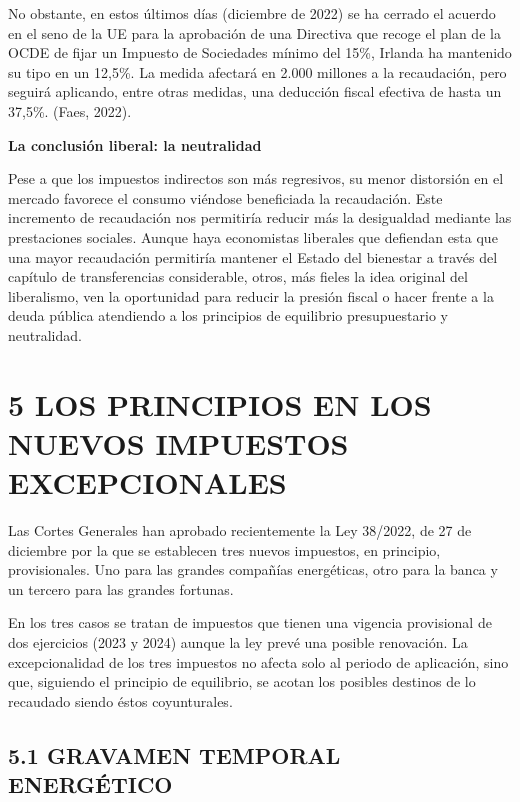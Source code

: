 \documentclass[
]{article}
\begin{document}
No obstante, en estos últimos días (diciembre de 2022) se ha cerrado el
acuerdo en el seno de la UE para la aprobación de una Directiva que
recoge el plan de la OCDE de fijar un Impuesto de Sociedades mínimo del
15\%, Irlanda ha mantenido su tipo en un 12,5\%. La medida afectará en
2.000 millones a la recaudación, pero seguirá aplicando, entre otras
medidas, una deducción fiscal efectiva de hasta un 37,5\%. (Faes, 2022).

\textbf{La conclusión liberal: la neutralidad}

Pese a que los impuestos indirectos son más regresivos, su menor
distorsión en el mercado favorece el consumo viéndose beneficiada la
recaudación. Este incremento de recaudación nos permitiría reducir más
la desigualdad mediante las prestaciones sociales. Aunque haya
economistas liberales que defiendan esta que una mayor recaudación
permitiría mantener el Estado del bienestar a través del capítulo de
transferencias considerable, otros, más fieles la idea original del
liberalismo, ven la oportunidad para reducir la presión fiscal o hacer
frente a la deuda pública atendiendo a los principios de equilibrio
presupuestario y neutralidad.

\hypertarget{los-principios-en-los-nuevos-impuestos-excepcionales}{%
\section*{5 LOS PRINCIPIOS EN LOS NUEVOS IMPUESTOS
EXCEPCIONALES}\label{los-principios-en-los-nuevos-impuestos-excepcionales}}

Las Cortes Generales han aprobado recientemente la Ley 38/2022, de 27 de
diciembre por la que se establecen tres nuevos impuestos, en principio,
provisionales. Uno para las grandes compañías energéticas, otro para la
banca y un tercero para las grandes fortunas.

En los tres casos se tratan de impuestos que tienen una vigencia
provisional de dos ejercicios (2023 y 2024) aunque la ley prevé una
posible renovación. La excepcionalidad de los tres impuestos no afecta
solo al periodo de aplicación, sino que, siguiendo el principio de
equilibrio, se acotan los posibles destinos de lo recaudado siendo éstos
coyunturales.

\hypertarget{gravamen-temporal-energuxe9tico}{%
\subsection{5.1 GRAVAMEN TEMPORAL
ENERGÉTICO}\label{gravamen-temporal-energuxe9tico}}
\end{document}
